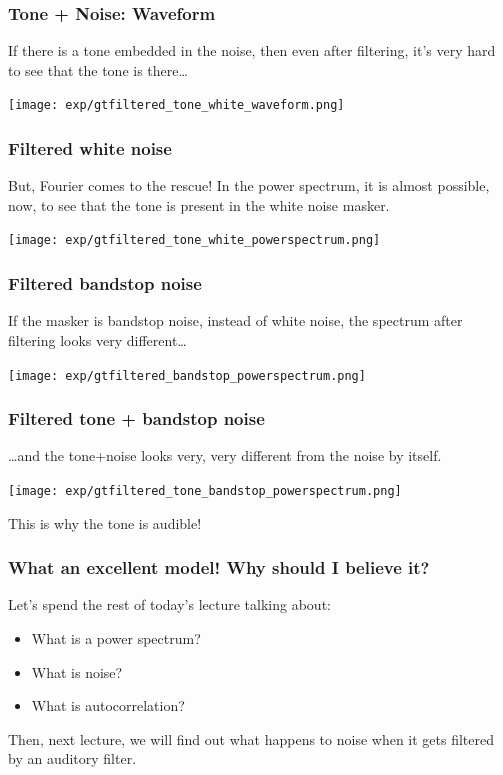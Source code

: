 \documentclass{beamer}
\begin{document}
\begin{frame}
  \frametitle{Tone + Noise: Waveform}

  If there is a tone embedded in the noise, then even after filtering, it's
  very hard to see that the tone is there\ldots
  
  \centerline{\texttt{[image: exp/gtfiltered\_tone\_white\_waveform.png]}}
\end{frame}
     
\begin{frame}
  \frametitle{Filtered white noise}

  But, Fourier comes to the rescue!  In the power spectrum, it is
  almost possible, now, to see that the tone is present in the white noise masker.
  
  \centerline{\texttt{[image: exp/gtfiltered\_tone\_white\_powerspectrum.png]}}
\end{frame}
     
\begin{frame}
  \frametitle{Filtered bandstop noise}

  If the masker is bandstop noise, instead of white noise, the spectrum
  after filtering looks very different\ldots
  
  \centerline{\texttt{[image: exp/gtfiltered\_bandstop\_powerspectrum.png]}}
\end{frame}
     
\begin{frame}
  \frametitle{Filtered tone + bandstop noise}

  \ldots and the tone+noise looks very, very different from the noise by itself.
  \centerline{\texttt{[image: exp/gtfiltered\_tone\_bandstop\_powerspectrum.png]}}
  \centerline{\huge This is why the tone is audible!}
\end{frame}

\begin{frame}
  \frametitle{What an excellent model!  Why should  I believe it?}

  Let's spend the rest of today's lecture talking about:
  \begin{itemize}
  \item What is a power spectrum?
  \item What is noise?
  \item What is autocorrelation?
  \end{itemize}
  Then, next lecture, we will find out what happens to noise when it gets
  filtered by an auditory filter.
\end{frame}
\end{document}
